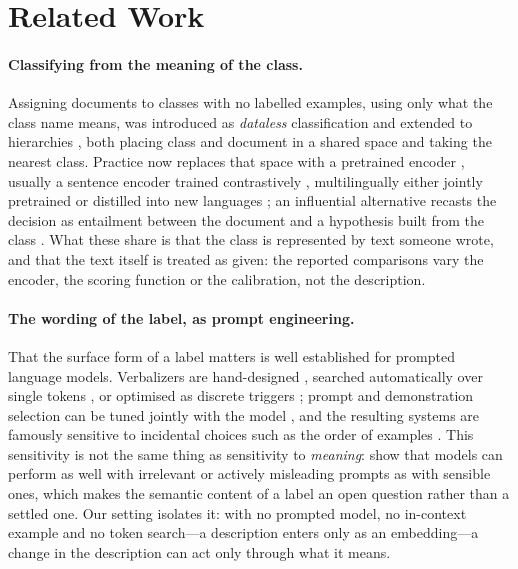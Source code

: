 \documentclass[11pt]{article}
\begin{document}
\section{Related Work}

\paragraph{Classifying from the meaning of the class.}
Assigning documents to classes with no labelled examples, using only what the
class name means, was introduced as \emph{dataless} classification
\citep{chang-etal-2008-importance} and extended to hierarchies
\citep{song-roth-2014-dataless}, both placing class and document in a shared
space and taking the nearest class. Practice now replaces that space with a
pretrained encoder \citep{devlin-etal-2019-bert}, usually a sentence encoder
trained contrastively \citep{reimers-gurevych-2019-sentence}, multilingually
either jointly pretrained \citep{conneau-etal-2020-unsupervised} or distilled
into new languages \citep{reimers-gurevych-2020-making}; an influential
alternative recasts the decision as entailment between the document and a
hypothesis built from the class \citep{yin-etal-2019-benchmarking}. What
these share is that the class is represented by text someone wrote, and that the
text itself is treated as given: the reported comparisons vary the encoder, the
scoring function or the calibration, not the description.

\paragraph{The wording of the label, as prompt engineering.}
That the surface form of a label matters is well established for prompted
language models. Verbalizers are hand-designed \citep{schick-schutze-2021-exploiting},
searched automatically over single tokens \citep{schick-etal-2020-automatically},
or optimised as discrete triggers \citep{shin-etal-2020-autoprompt}; prompt and
demonstration selection can be tuned jointly with the model
\citep{gao-etal-2021-making}, and the resulting systems are famously sensitive
to incidental choices such as the order of examples
\citep{lu-etal-2022-fantastically}. This sensitivity is not the same thing as
sensitivity to \emph{meaning}: \citet{webson-pavlick-2022-prompt} show that
models can perform as well with irrelevant or actively misleading prompts as
with sensible ones, which makes the semantic content of a label an open question
rather than a settled one. Our setting isolates it: with no prompted model, no
in-context example and no token search---a description enters only as an
embedding---a change in the description can act only through what it means.
\end{document}
